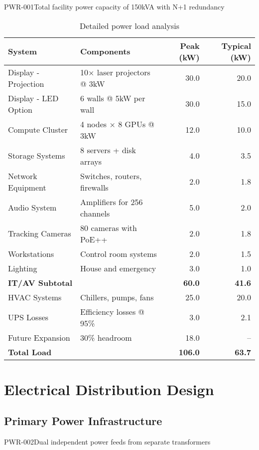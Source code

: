 \begin{requirement}{PWR-001}{Total facility power capacity of 150kVA with N+1 redundancy}

\begin{table}[H]
\centering
\begin{tabularx}{\textwidth}{@{}lXrr@{}}
\toprule
\textbf{System} & \textbf{Components} & \textbf{Peak (kW)} & \textbf{Typical (kW)} \\
\midrule
Display - Projection & 10× laser projectors @ 3kW & 30.0 & 20.0 \\
Display - LED Option & 6 walls @ 5kW per wall & 30.0 & 15.0 \\
Compute Cluster & 4 nodes × 8 GPUs @ 3kW & 12.0 & 10.0 \\
Storage Systems & 8 servers + disk arrays & 4.0 & 3.5 \\
Network Equipment & Switches, routers, firewalls & 2.0 & 1.8 \\
Audio System & Amplifiers for 256 channels & 5.0 & 2.0 \\
Tracking Cameras & 80 cameras with PoE++ & 2.0 & 1.8 \\
Workstations & Control room systems & 2.0 & 1.5 \\
Lighting & House and emergency & 3.0 & 1.0 \\
\midrule
\textbf{IT/AV Subtotal} & & \textbf{60.0} & \textbf{41.6} \\
\midrule
HVAC Systems & Chillers, pumps, fans & 25.0 & 20.0 \\
UPS Losses & Efficiency losses @ 95\% & 3.0 & 2.1 \\
Future Expansion & 30\% headroom & 18.0 & -- \\
\midrule
\textbf{Total Load} & & \textbf{106.0} & \textbf{63.7} \\
\bottomrule
\end{tabularx}
\caption{Detailed power load analysis}
\end{table}

\section{Electrical Distribution Design}

\subsection{Primary Power Infrastructure}

\begin{requirement}{PWR-002}{Dual independent power feeds from separate transformers}


\end{requirement}
\end{requirement}
